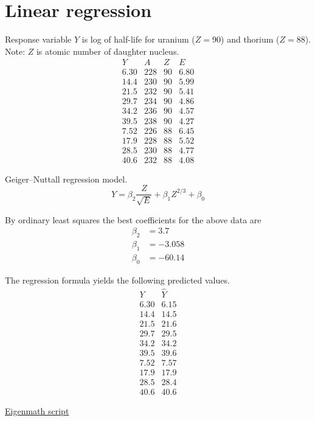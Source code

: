 

\section*{Linear regression}

Response variable $Y$ is log of half-life for uranium ($Z=90$)
and thorium ($Z=88$).
Note: $Z$ is atomic number of daughter nucleus.
\begin{equation*}
\begin{matrix}
Y & A & Z & E
\\[1ex]
6.30 & 228 & 90 & 6.80
\\
14.4 & 230 & 90 & 5.99
\\
21.5 & 232 & 90 & 5.41
\\
29.7 & 234 & 90 & 4.86
\\
34.2 & 236 & 90 & 4.57
\\
39.5 & 238 & 90 & 4.27
\\
7.52 & 226 & 88 & 6.45
\\
17.9 & 228 & 88 & 5.52
\\
28.5 & 230 & 88 & 4.77
\\
40.6 & 232 & 88 & 4.08
\end{matrix}
\end{equation*}

Geiger–Nuttall regression model.
\begin{equation*}
\hat Y=\beta_2\frac{Z}{\sqrt E}+\beta_1Z^{2/3}+\beta_0
\end{equation*}

By ordinary least squares the best coefficients for the above data are
\begin{align*}
\beta_2&=3.7
\\
\beta_1&=-3.058
\\
\beta_0&=-60.14
\end{align*}

The regression formula yields the following predicted values.
\begin{equation*}
\begin{matrix}
Y & \hat Y
\\[1ex]
6.30 & 6.15
\\
14.4 & 14.5
\\
21.5 & 21.6
\\
29.7 & 29.5
\\
34.2 & 34.2
\\
39.5 & 39.6
\\
7.52 & 7.57
\\
17.9 & 17.9
\\
28.5 & 28.4
\\
40.6 & 40.6
\end{matrix}
\end{equation*}

\href{https://georgeweigt.github.io/examples/linear-regression-demo.html}{Eigenmath script}


